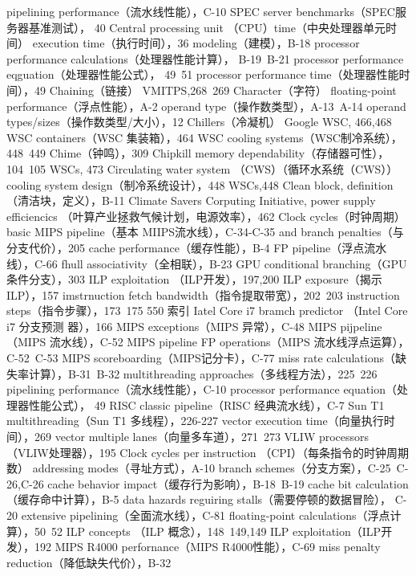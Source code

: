 pipelining performance（流水线性能），C-10
SPEC server benchmarks（SPEC服务器基准测试），
40
Central processing unit （CPU）time（中央处理器单元时间）
execution time（执行时间），36
modeling（建模），B-18
processor performance calculations（处理器性能计算），
B-19~B-21
processor performance eqguation（处理器性能公式），
49~51
processor performance time（处理器性能时间），49
Chaining（链接）
VMITPS,268~269
Character（字符）
floating-point performance（浮点性能），A-2
operand type（操作数类型），A-13~A-14
operand types/sizes（操作数类型/大小），12
Chillers（冷凝机）
Google WSC, 466,468
WSC containers（WSC 集装箱），464
WSC cooling systems（WSC制冷系统），448~449
Chime（钟鸣），309
Chipkill
memory dependability（存储器可性），104~105
WSCs, 473
Circulating water system （CWS）（循环水系统（CWS））
cooling system design（制冷系统设计），448
WSCs,448
Clean block, definition（清洁块，定义），B-11
Climate Savers Corputing Initiative, power supply efficiencics
（叶算产业拯救气候计划，电源效率），462
Clock cycles（时钟周期）
basic MIPS pipeline（基本 MIIPS流水线），C-34-C-35
and branch penalties（与分支代价），205
cache performance（缓存性能），B-4
FP pipeline（浮点流水线），C-66
fhull associativity（全相联），B-23
GPU conditional branching（GPU条件分支），303
ILP exploitation （ILP开发），197,200
ILP exposure（揭示 ILP），157
imstrnuction fetch bandwidth（指令提取带宽），202~203
instruction steps（指令步骤），173~175
550
索引
Iatel Core i7 bramch predictor （Intel Core i7 分支预测
器），166
MIPS exceptions（MIPS 异常），C-48
MIPS pijpeline（MIPS 流水线），C-52
MIPS pipeline FP operations（MIPS 流水线浮点运算），
C-52~C-53
MIPS scoreboarding（MIPS记分卡），C-77
miss rate calculations（缺失率计算），B-31~B-32
multithreading approaches（多线程方法），225~226
pipelining performance（流水线性能），C-10
processor performance equation（处理器性能公式），
49
RISC classic pipeline（RISC 经典流水线），C-7
Sun T1 multithreading（Sun T1 多线程），226-227
vector execution time（向量执行时间），269
vector multiple lanes（向量多车道），271~273
VLIW processors（VLIW处理器），195
Clock cycles per instruction （CPI）（每条指令的时钟周期数）
addressing modes（寻址方式），A-10
branch schemes（分支方案），C-25~C-26,C-26
cache behavior impact（缓存行为影响），B-18~B-19
cache bit calculation（缓存命中计算），B-5
data hazards reguiring stalls（需要停顿的数据冒险），
C-20
extensive pipelining（全面流水线），C-81
floating-point calculations（浮点计算），50~52
ILP concepts （ILP 概念），148~149,149
ILP exploitation（ILP开发），192
MIPS R4000 perfornance（MIPS R4000性能），C-69
miss penalty reduction（降低缺失代价），B-32
